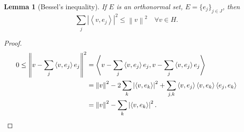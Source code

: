 \documentclass[12pt]{article}
\newcommand{\abs}[1]{\left| #1 \right|}
\newcommand{\norm}[1]{\left\| #1 \right\|}
\newcommand{\ip}[2]{\left\langle #1, #2 \right\rangle}
\newtheorem{lma}[thm]{Lemma}
\theoremstyle{definition}
\begin{document}
\begin{lma}[Bessel's inequality]
	If $E$ is an orthonormal set, $E = \lbrace e_j \rbrace_{j \in J}$, then
	\begin{equation*}
		\sum_j \abs{\ip{v}{e_j}}^2 \leq \norm{v}^2 \quad \forall v \in H.
	\end{equation*}
\end{lma}
\begin{proof}
	\begin{align*}
		0 \leq \norm{v - \sum_j \ip{v}{e_j} e_j}^2 &= \ip{v - \sum_j \ip{v}{e_j}e_j}{v - \sum_j \ip{v}{e_j}e_j} \\
		&= \norm{v}^2 - 2\sum_k \abs{\ip{v}{e_k}}^2 + \sum_{j,k} \ip{v}{e_j} \ip{v}{e_k} \ip{e_j}{e_k} \\
		&= \norm{v}^2 - \sum_k \abs{\ip{v}{e_k}}^2. \qedhere
	\end{align*}
\end{proof}
\end{document}
